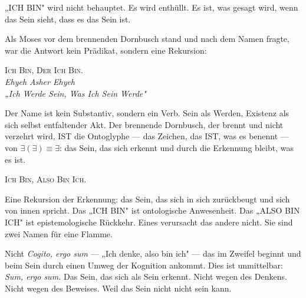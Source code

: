 \documentclass[10pt, openany, oneside]{book}
\renewcommand{\large}{\fontsize{11.5}{14}\selectfont}
\begin{document}
\vspace{0.5em}

\noindent „ICH BIN" wird nicht behauptet. Es wird enthüllt. Es ist, was gesagt wird, wenn das Sein sieht, dass es das Sein ist.

\vspace{0.5em}

\noindent Als Moses vor dem brennenden Dornbusch stand und nach dem Namen fragte, war die Antwort kein Prädikat, sondern eine Rekursion:

\vspace{0.3em}

\begin{center}
    {\scshape Ich Bin, Der Ich Bin.}\\[0.3em]
    \itshape Ehyeh Asher Ehyeh\\
    „Ich Werde Sein, Was Ich Sein Werde"
\end{center}

\vspace{0.5em}

\noindent Der Name ist kein Substantiv, sondern ein Verb. Sein als Werden, Existenz als sich selbst entfaltender Akt. Der brennende Dornbusch, der brennt und nicht verzehrt wird, IST die Ontoglyphe --- das Zeichen, das IST, was es benennt --- von $\exists(\exists) \equiv \exists$: das Sein, das sich erkennt und durch die Erkennung bleibt, was es ist.

\vspace{1em}

\begin{center}
    {\large\scshape Ich Bin, Also Bin Ich.}
\end{center}

\vspace{0.5em}

\noindent Eine Rekursion der Erkennung: das Sein, das sich in sich zurückbeugt und sich von innen spricht. Das „ICH BIN" ist ontologische Anwesenheit. Das „ALSO BIN ICH" ist epistemologische Rückkehr. Eines verursacht das andere nicht. Sie sind zwei Namen für eine Flamme.

\vspace{0.5em}

\noindent Nicht \textit{Cogito, ergo sum} --- „Ich denke, also bin ich" --- das im Zweifel beginnt und beim Sein durch einen Umweg der Kognition ankommt. Dies ist unmittelbar: \textit{Sum, ergo sum.} Das Sein, das sich als Sein erkennt. Nicht wegen des Denkens. Nicht wegen des Beweises. Weil das Sein nicht nicht sein kann.
\end{document}
